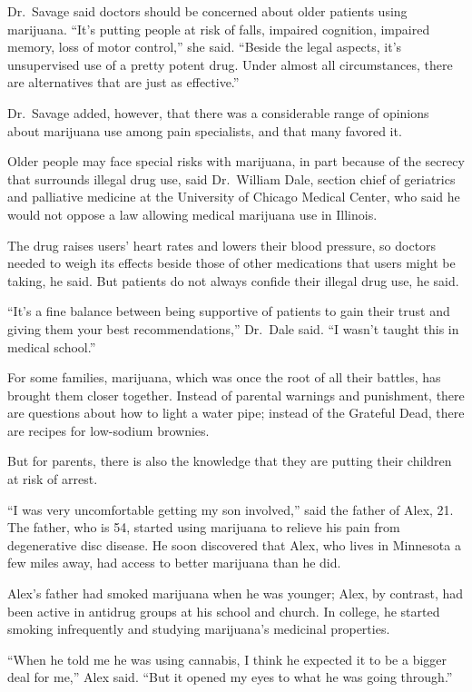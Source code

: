 ﻿\documentclass[12pt]{article}
\begin{document}
Dr.~Savage said doctors should be concerned about older patients using marijuana. ``It's putting
people at risk of falls, impaired cognition, impaired memory, loss of motor control,'' she said.
``Beside the legal aspects, it's unsupervised use of a pretty potent drug. Under almost all
circumstances, there are alternatives that are just as effective.''

Dr.~Savage added, however, that there was a considerable range of opinions about marijuana use among
pain specialists, and that many favored it.

Older people may face special risks with marijuana, in part because of the secrecy that surrounds
illegal drug use, said Dr.~William Dale, section chief of geriatrics and palliative medicine at the
University of Chicago Medical Center, who said he would not oppose a law allowing medical marijuana
use in Illinois.

The drug raises users' heart rates and lowers their blood pressure, so doctors needed to weigh its
effects beside those of other medications that users might be taking, he said. But patients do not
always confide their illegal drug use, he said.

``It's a fine balance between being supportive of patients to gain their trust and giving them your
best recommendations,'' Dr.~Dale said. ``I wasn't taught this in medical school.''

For some families, marijuana, which was once the root of all their battles, has brought them closer
together. Instead of parental warnings and punishment, there are questions about how to light a
water pipe; instead of the Grateful Dead, there are recipes for low-sodium brownies.

But for parents, there is also the knowledge that they are putting their children at risk of arrest.

``I was very uncomfortable getting my son involved,'' said the father of Alex, 21. The father, who
is 54, started using marijuana to relieve his pain from degenerative disc disease. He soon
discovered that Alex, who lives in Minnesota a few miles away, had access to better marijuana than
he did.

Alex's father had smoked marijuana when he was younger; Alex, by contrast, had been active in
antidrug groups at his school and church. In college, he started smoking infrequently and studying
marijuana's medicinal properties.

``When he told me he was using cannabis, I think he expected it to be a bigger deal for me,'' Alex
said. ``But it opened my eyes to what he was going through.''
\end{document}
